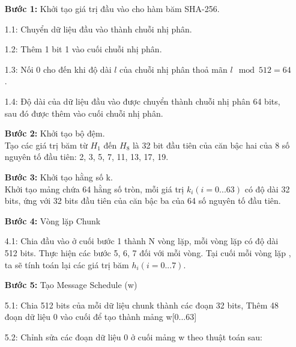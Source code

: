 \begin{itemize}
    \item[\textbf{Bước 1: }] Khởi tạo giá trị đầu vào cho hàm băm SHA-256.
        \item[1.1:] Chuyển dữ liệu đầu vào thành chuỗi nhị phân.
        \item[1.2:] Thêm 1 bit 1 vào cuối chuỗi nhị phân.
        \item[1.3:] Nối 0 cho đến khi độ dài $l$ của chuỗi nhị phân thoả mãn $ l \mod 512 = 64$.
        \item[1.4:] Độ dài của dữ liệu đầu vào được chuyển thành chuỗi nhị phân 64 bits, 
        sau đó được thêm vào cuối chuỗi nhị phân. 
    \item[\textbf{Bước 2:}] Khởi tạo bộ đệm. \\
        Tạo các giá trị băm từ $H_1$ đến $H_8$ là 32 bit đầu tiên của
        căn bậc hai của 8 số nguyên tố đầu tiên: 2, 3, 5, 7, 11, 13, 17, 19.
    \item[\textbf{Bước 3:}] Khởi tạo hằng số k. \\
        Khởi tạo mảng chứa 64 hằng số tròn, mỗi giá trị $k_i (i = 0...63)$
        có độ dài 32 bits, ứng với 32 bits đầu tiên của căn bậc ba của 64 số nguyên tố 
        đầu tiên.
    \item[\textbf{Bước 4:}] Vòng lặp Chunk
        \item[4.1:] Chia đầu vào ở cuối bước 1 thành N vòng lặp, mỗi vòng lặp có độ
        dài 512 bits.
        Thực hiện các bước 5, 6, 7 đối với mỗi vòng. Tại cuối mỗi vòng
        lặp , ta sẽ tính toán lại các giá trị băm $h_i (i = 0...7)$. 
    \item[\textbf{Bước 5:}] Tạo Message Schedule (w)
        \item[5.1:] Chia 512 bits của mỗi dữ liệu chunk thành các đoạn 32 bits,
        Thêm 48 đoạn dữ liệu 0 vào cuối để tạo thành mảng w[0...63]
        \item[5.2:] Chỉnh sửa các đoạn dữ liệu 0 ở cuối mảng w theo thuật toán sau:


\end{itemize}
